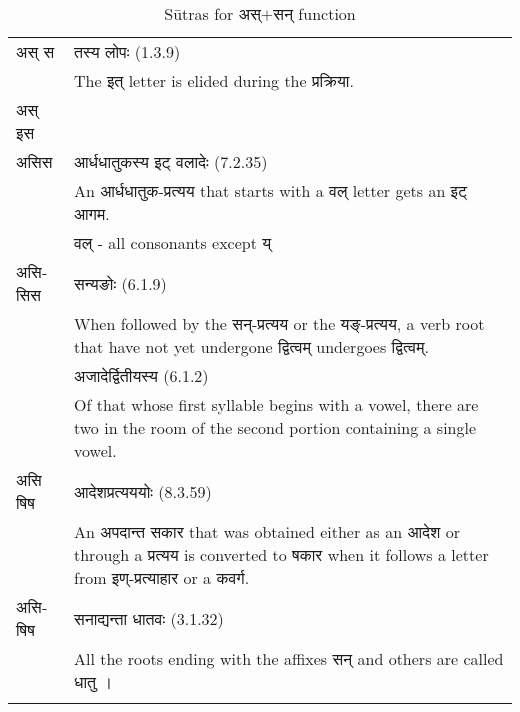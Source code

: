 \begin{longtable}{ |p{1.4cm}|p{14.6cm}| }
			\texthindi{अस् स}
			&\texthindi{तस्य लोपः} (1.3.9)\\
			\rowcolor{red!10}
			&The \texthindi{इत्} letter is elided during the \texthindi{प्रक्रिया}.
			\\\hline
			\rowcolor{yellow!10}
			\texthindi{अस् इस}
			&\\
			\rowcolor{yellow!10}\texthindi{असिस}
			&\texthindi{आर्धधातुकस्य इट् वलादेः} (7.2.35)\\
			\rowcolor{yellow!10}
			&An \texthindi{आर्धधातुक-प्रत्यय} that starts with a \texthindi{वल्} letter gets an \texthindi{इट् आगम}.\\ 
			\rowcolor{yellow!10}
			&\texthindi{वल्} - all consonants except \texthindi{य्}
			\\\hline
			\rowcolor{green!10}
			\texthindi{असिसिस}
			&\texthindi{सन्यङोः} (6.1.9)\\
			\rowcolor{green!10}
			&When followed by the \texthindi{सन्-प्रत्यय} or the \texthindi{यङ्-प्रत्यय}, a verb root that have not yet undergone \texthindi{द्वित्वम्} undergoes \texthindi{द्वित्वम्}.
			\\\hline
			\rowcolor{green!10}
			&\texthindi{अजादेर्द्वितीयस्य} (6.1.2)\\
			\rowcolor{green!10}
			&Of that whose first syllable begins with a vowel, there are two in the room of the second portion containing a single vowel. 
			\\\hline
			\rowcolor{green!10}
			\texthindi{असि षिष}
			&\texthindi{आदेशप्रत्यययोः} (8.3.59)\\
			\rowcolor{green!10}
			&An \texthindi{अपदान्त सकार} that was obtained either as an \texthindi{आदेश} or through a \texthindi{प्रत्यय} is converted to \texthindi{षकार} when it follows a letter from \texthindi{इण्-प्रत्याहार} or a \texthindi{कवर्ग}.
			\\\hline
			\rowcolor{green!10}
			\texthindi{असिषिष}
			&\texthindi{सनाद्यन्ता धातवः} (3.1.32)\\
			\rowcolor{green!10}
			&All the roots ending with the affixes \texthindi{सन्} and others are called \texthindi{धातु} ।
			\\\hline
		
		\caption{Sūtras for \texthindi{अस्$+$सन्} function}
		\label{table:a16}
		\end{longtable}


